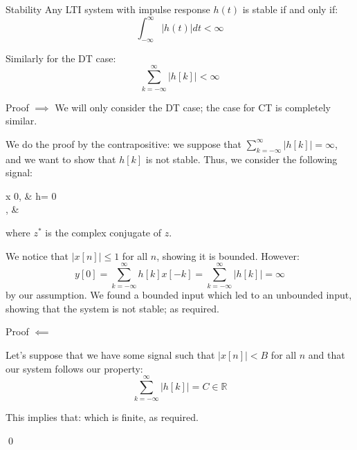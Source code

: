 \documentclass[a4paper]{article}
\begin{document}
\begin{parag}{Stability}
    Any LTI system with impulse response $h\left(t\right)$ is stable if and only if: 
    \[\int_{-\infty}^{\infty} \left|h\left(t\right)\right|dt < \infty\]
    
    Similarly for the DT case: 
    \[\sum_{k=-\infty}^{\infty} \left|h\left[k\right]\right| < \infty\]
    
    \begin{subparag}{Proof $\implies$}
        We will only consider the DT case; the case for CT is completely similar.

        We do the proof by the contrapositive: we suppose that $\sum_{k=-\infty}^{\infty} \left|h\left[k\right]\right| = \infty$, and we want to show that $h\left[k\right]$ is not stable. Thus, we consider the following signal: 
        \begin{functionbypart}{x\left[n\right]}
            0, & h\left[-n\right] = 0 \\
            , & 
        \end{functionbypart}
        where $z^*$ is the complex conjugate of $z$. 

        We notice that $\left|x\left[n\right]\right| \leq 1$ for all $n$, showing it is bounded. However: 
        \[y\left[0\right] = \sum_{k=-\infty}^{\infty} h\left[k\right]x\left[-k\right] = \sum_{k=-\infty}^{\infty} \left|h\left[k\right]\right| = \infty\]
        by our assumption. We found a bounded input which led to an unbounded input, showing that the system is not stable; as required.
    \end{subparag}
    
    \begin{subparag}{Proof $\impliedby$}

        Let's suppose that we have some signal such that $\left|x\left[n\right]\right| < B$ for all $n$ and that our system follows our property: 
        \[\sum_{k=-\infty}^{\infty} \left|h\left[k\right]\right| = C \in\mathbb{R}\]
        
        This implies that: 
        which is finite, as required.

        \qed
    \end{subparag}

\end{parag}
\end{document}
